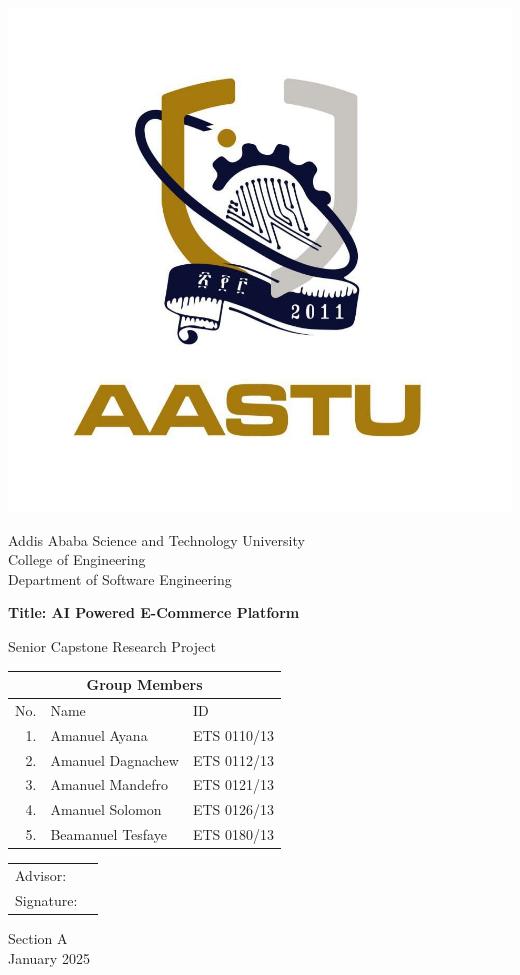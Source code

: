 \documentclass[12pt]{report}
\begin{document}
\begin{titlepage}
	\setlength{\parskip}{0pt}
	\singlespacing
	\begin{center}
		\includegraphics[width=0.4\linewidth]{aastu}

		\Large
		Addis Ababa Science and Technology University \\
		College of Engineering \\
		Department of Software Engineering

		\vspace*{1cm}

		\LARGE
		\textbf{Title: AI Powered E-Commerce Platform}

		\vspace{0.25cm}

		\LARGE
		Senior Capstone Research Project

		\vspace{1.25cm}

		\Large
		\begin{tabular}{ |r|l|l| }
			\hline
			\multicolumn{3}{|c|}{\textbf{Group Members}} \\
			\hline
			No. & Name              & ID                 \\
			\hline
			1.  & Amanuel Ayana     & ETS 0110/13        \\
			2.  & Amanuel Dagnachew & ETS 0112/13        \\
			3.  & Amanuel Mandefro  & ETS 0121/13        \\
			4.  & Amanuel Solomon   & ETS 0126/13        \\
			5.  & Beamanuel Tesfaye & ETS 0180/13        \\
			\hline
		\end{tabular}


		\vfill

		\Large
		\begin{tabular}{@{}p{1in}p{3in}@{}}
			Advisor:   & \hrulefill \\
			Signature: & \hrulefill \\
		\end{tabular}

		\vspace{1.25cm}
		Section A\\
		January 2025
	\end{center}
\end{titlepage}
\newpage
\end{document}
